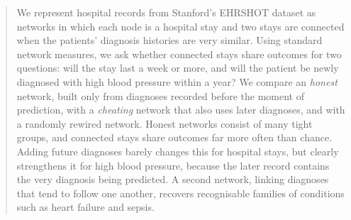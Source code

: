 \begin{abstract}
We represent hospital records from Stanford's EHRSHOT dataset as networks in which each node is a hospital stay and two stays are connected when the patients' diagnosis histories are very similar. Using standard network measures, we ask whether connected stays share outcomes for two questions: will the stay last a week or more, and will the patient be newly diagnosed with high blood pressure within a year? We compare an \emph{honest} network, built only from diagnoses recorded before the moment of prediction, with a \emph{cheating} network that also uses later diagnoses, and with a randomly rewired network. Honest networks consist of many tight groups, and connected stays share outcomes far more often than chance. Adding future diagnoses barely changes this for hospital stays, but clearly strengthens it for high blood pressure, because the later record contains the very diagnosis being predicted. A second network, linking diagnoses that tend to follow one another, recovers recognisable families of conditions such as heart failure and sepsis.
\end{abstract}
